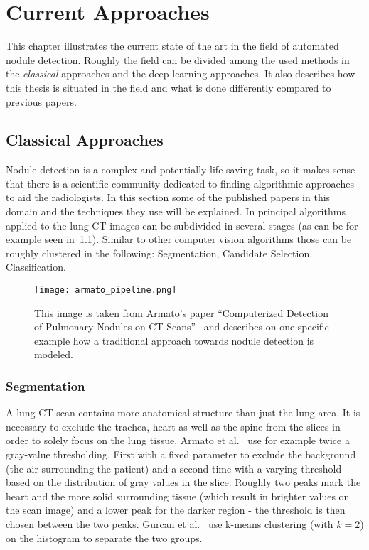 \documentclass[main.tex]{subfiles}
\begin{document}
\chapter{Current Approaches}\label{chap:approaches}
This chapter illustrates the current state of the art in the field of automated nodule detection. Roughly the field can be divided among the used methods in the \emph{classical} approaches and the deep learning approaches. It also describes how this thesis is situated in the field and what is done differently compared to previous papers.

\section{Classical Approaches}
Nodule detection is a complex and potentially life-saving task, so it makes sense that there is a scientific community dedicated to finding algorithmic approaches to aid the radiologists. In this section some of the published papers in this domain and the techniques they use will be explained. In principal algorithms applied to the lung CT images can be subdivided in several stages (as can be for example seen in~\ref{fig:pipeline}). Similar to other computer vision algorithms those can be roughly clustered in the following: Segmentation, Candidate Selection, Classification.


\begin{figure}[ht]
\centering
\texttt{[image: armato\_pipeline.png]}
\caption{This image is taken from Armato's paper ``Computerized Detection
of Pulmonary Nodules on CT Scans''~\cite{armato1999computerized} and describes on one specific example how a traditional approach towards nodule detection is modeled.}
\label{fig:pipeline}
\end{figure}


\subsection{Segmentation}
A lung CT scan contains more anatomical structure than just the lung area. It is necessary to exclude the trachea, heart as well as the spine from the slices in order to solely focus on the lung tissue. Armato et al.~\cite{armato1999computerized,armato2001automated} use for example twice a gray-value thresholding. First with a fixed parameter to exclude the background (the air surrounding the patient) and a second time with a varying threshold based on the distribution of gray values in the slice. Roughly two peaks mark the heart and the more solid surrounding tissue (which result in brighter values on the scan image) and a lower peak for the darker region - the threshold is then chosen between the two peaks. Gurcan et al.~\cite{gurcan2002lung} use k-means clustering (with $k=2$) on the histogram to separate the two groups. 
\end{document}
